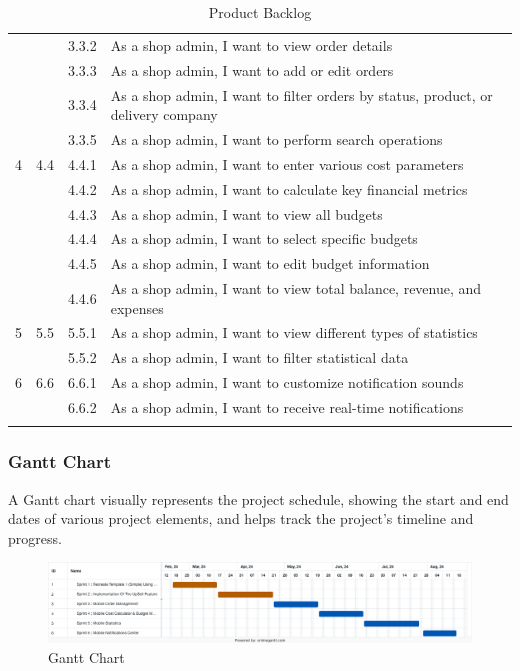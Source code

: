 \begin{longtable}{|c|c|c|p{10cm}|}
& & 3.3.2 & As a shop admin, I want to view order details \\ \cline{3-4}
& & 3.3.3 & As a shop admin, I want to add or edit orders \\ \cline{3-4}
& & 3.3.4 & As a shop admin, I want to filter orders by status, product, or delivery company \\ \cline{3-4}
& & 3.3.5 & As a shop admin, I want to perform search operations \\ \hline
\multirow{1}{*}{4} & \multirow{1}{*}{4.4} & 4.4.1 & As a shop admin, I want to enter various cost parameters \\ \cline{3-4}
& & 4.4.2 & As a shop admin, I want to calculate key financial metrics \\ \cline{3-4}
& & 4.4.3 & As a shop admin, I want to view all budgets \\ \cline{3-4}
& & 4.4.4 & As a shop admin, I want to select specific budgets \\ \cline{3-4}
& & 4.4.5 & As a shop admin, I want to edit budget information \\ \cline{3-4}
& & 4.4.6 & As a shop admin, I want to view total balance, revenue, and expenses \\ \hline
\multirow{1}{*}{5} & \multirow{1}{*}{5.5} & 5.5.1 & As a shop admin, I want to view different types of statistics \\ \cline{3-4}
& & 5.5.2 & As a shop admin, I want to filter statistical data \\ \hline
\multirow{1}{*}{6} & \multirow{1}{*}{6.6} & 6.6.1 & As a shop admin, I want to customize notification sounds \\ \cline{3-4}
& & 6.6.2 & As a shop admin, I want to receive real-time notifications \\ \hline

\caption{Product Backlog}
\label{tab:product_backlog}
\end{longtable}

\subsubsection{Gantt Chart}
A Gantt chart visually represents the project schedule, showing the start and end dates of various project elements, and helps track the project's timeline and progress.

\begin{figure}[h]
  \centering
  \includegraphics[width=1\textwidth]{Images/Online Gantt 20240715.png}
  \caption{Gantt Chart}
  \label{fig:Gantt Chart}
\end{figure}


